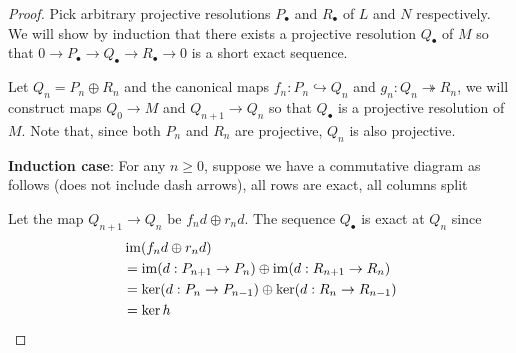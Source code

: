 \begin{proof}
	Pick arbitrary projective resolutions $P_\bullet$ and $R_\bullet$ of $L$ and $N$ respectively. We will show by induction that there exists a projective resolution $Q_\bullet$ of $M$ so that $0 \to P_\bullet \to Q_\bullet \to R_\bullet \to 0$ is a short exact sequence.
	
	Let $Q_n = P_n \oplus R_n$ and the canonical maps $f_n: P_n \hookrightarrow Q_n$ and $g_n: Q_n \twoheadrightarrow R_n$, we will construct maps $Q_0 \to M$ and $Q_{n+1} \to Q_n$ so that $Q_\bullet$ is a projective resolution of $M$. Note that, since both $P_n$ and $R_n$ are projective, $Q_n$ is also projective.
	
	\textbf{Induction case}: For any $n \geq 0$, suppose we have a commutative diagram as follows (does not include dash arrows), all rows are exact, all columns split
	
	
	
	\begin{center}
	\end{center}
	
	Let the map $Q_{n+1} \to Q_n$ be $f_n d \oplus r_n d$. The sequence $Q_\bullet$ is exact at $Q_n$ since 
	\begin{align*}
		&\operatorname{im} (f_n d \oplus r_n d) \\
		&= \operatorname{im} (d: P_{n+1} \to P_n) \oplus \operatorname{im} (d: R_{n+1} \to R_n) \\
		&=  \ker (d: P_n \to P_{n-1}) \oplus \ker (d: R_n \to R_{n-1}) \\
		&= \ker h
	\end{align*}


\end{proof}
